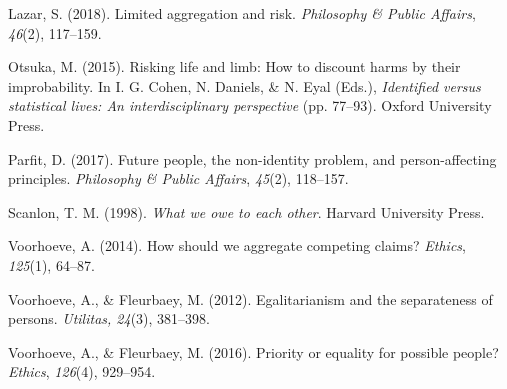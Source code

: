 \documentclass[man,11pt,a4paper]{apa7}
\begin{document}
\makeatletter\let\section\old@apaSeven@section\makeatother
\section{References}
\begin{list}{}{\setlength{\leftmargin}{0.5in}\setlength{\itemindent}{-0.5in}\setlength{\itemsep}{0pt}\setlength{\parsep}{0pt}}\linespread{2}\selectfont
\item Lazar, S. (2018). Limited aggregation and risk. \textit{Philosophy \& Public Affairs}, \textit{46}(2), 117--159.
\item Otsuka, M. (2015). Risking life and limb: How to discount harms by their improbability. In I. G. Cohen, N. Daniels, \& N. Eyal (Eds.), \textit{Identified versus statistical lives: An interdisciplinary perspective} (pp. 77--93). Oxford University Press.
\item Parfit, D. (2017). Future people, the non-identity problem, and person-affecting principles. \textit{Philosophy \& Public Affairs}, \textit{45}(2), 118--157.
\item Scanlon, T. M. (1998). \textit{What we owe to each other}. Harvard University Press.
\item Voorhoeve, A. (2014). How should we aggregate competing claims? \textit{Ethics}, \textit{125}(1), 64--87.
\item Voorhoeve, A., \& Fleurbaey, M. (2012). Egalitarianism and the separateness of persons. \textit{Utilitas, 24}(3), 381--398.
\item Voorhoeve, A., \& Fleurbaey, M. (2016). Priority or equality for possible people? \textit{Ethics}, \textit{126}(4), 929--954.
\end{list}
\end{document}

